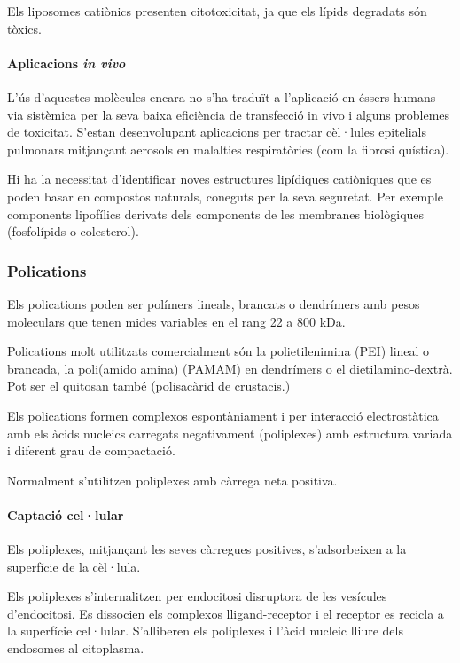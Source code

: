 Els liposomes catiònics presenten citotoxicitat, ja que els lípids degradats són tòxics.

\paragraph{Aplicacions \textit{in vivo}}
L'ús d'aquestes molècules encara no s'ha traduït a l'aplicació en éssers humans via sistèmica per la seva baixa eficiència de transfecció in vivo i alguns problemes de toxicitat. S'estan desenvolupant aplicacions per tractar cèl·lules epitelials pulmonars mitjançant aerosols en malalties respiratòries (com la fibrosi quística).

Hi ha la necessitat d'identificar noves estructures lipídiques catiòniques que es poden basar en compostos naturals, coneguts per la seva seguretat. Per exemple components lipofílics derivats dels components de les membranes biològiques (fosfolípids o colesterol).

\subsubsection{Polications}
\label{sec:polications}

Els polications poden ser polímers lineals, brancats o dendrímers amb pesos moleculars que tenen mides variables en el rang 22 a 800 kDa.

Polications molt utilitzats comercialment són la polietilenimina (PEI) lineal o brancada, la poli(amido amina) (PAMAM) en dendrímers o el dietilamino-dextrà. Pot ser el quitosan també (polisacàrid de crustacis.)

Els polications formen complexos espontàniament i per interacció electrostàtica amb els àcids nucleics carregats negativament (poliplexes) amb estructura variada i diferent grau de compactació.

Normalment s'utilitzen poliplexes amb càrrega neta positiva.

\paragraph{Captació cel·lular}
Els poliplexes, mitjançant les seves càrregues positives, s'adsorbeixen a la superfície de la cèl·lula.

Els poliplexes s'internalitzen per endocitosi disruptora de les vesícules d'endocitosi. Es dissocien els complexos lligand-receptor i el receptor es recicla a la superfície cel·lular. S'alliberen els poliplexes i l'àcid nucleic lliure dels endosomes al citoplasma.

